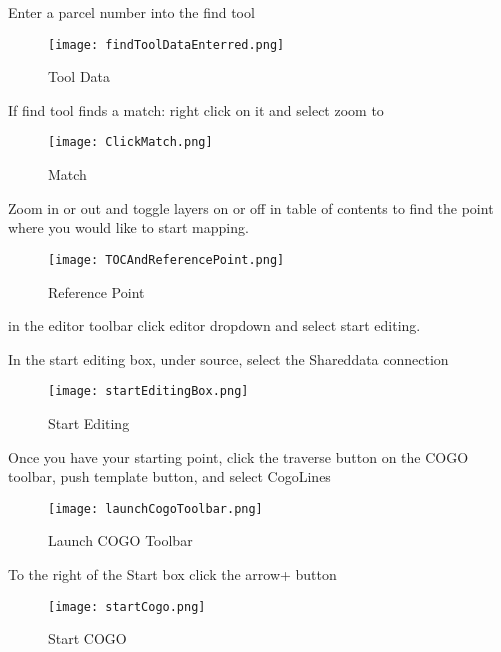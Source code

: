 Enter a parcel number into the find tool

\begin{figure}[h!]
\centering
    \texttt{[image: findToolDataEnterred.png]}

\caption{Tool Data}
\end{figure}
%
\clearpage

If find tool finds a match: 
right click on it and select zoom to

\begin{figure}[h!]
\centering
    \texttt{[image: ClickMatch.png]}

\caption{Match}
\end{figure}
%
\clearpage

Zoom in or out and toggle layers on or off in table of contents to find the point where you would like to start mapping.

\begin{figure}[h!]
\centering
    \texttt{[image: TOCAndReferencePoint.png]}

\caption{Reference Point}
\end{figure}
%
\clearpage


in the editor toolbar click editor dropdown and select start editing.

In the start editing box, under source, select the Shareddata connection

\begin{figure}[h!]
\centering
    \texttt{[image: startEditingBox.png]}

\caption{Start Editing}
\end{figure}
%
\clearpage

Once you have your starting point, click the traverse button on the COGO toolbar,
push template button, and select CogoLines

\begin{figure}[h!]
\centering
    \texttt{[image: launchCogoToolbar.png]}

\caption{Launch COGO Toolbar}
\end{figure}
%
\clearpage

To the right of the Start box click the arrow+ button
\begin{figure}[h!]
\centering
    \texttt{[image: startCogo.png]}

\caption{Start COGO}
\end{figure}
%
\clearpage


